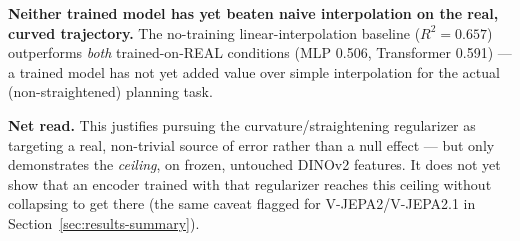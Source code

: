 \textbf{Neither trained model has yet beaten naive interpolation on the real, curved
trajectory.} The no-training linear-interpolation baseline ($R^2=0.657$) outperforms
\emph{both} trained-on-REAL conditions (MLP 0.506, Transformer 0.591) --- a trained
model has not yet added value over simple interpolation for the actual (non-straightened)
planning task.

\textbf{Net read.} This justifies pursuing the curvature/straightening regularizer as
targeting a real, non-trivial source of error rather than a null effect --- but only
demonstrates the \emph{ceiling}, on frozen, untouched DINOv2 features. It does not yet
show that an encoder trained with that regularizer reaches this ceiling without
collapsing to get there (the same caveat flagged for V-JEPA2/V-JEPA2.1 in
Section~\ref{sec:results-summary}).

